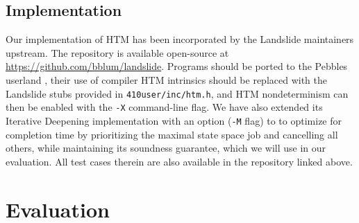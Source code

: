 \documentclass[10pt]{sigplanconf}
\begin{document}
\subsection{Implementation}

Our implementation of HTM has been incorporated by the Landslide maintainers upstream.
The repository is available open-source at \url{https://github.com/bblum/landslide}.
Programs should be ported to the Pebbles userland \cite{thrlib,kspec},
their use of compiler HTM intrinsics should be replaced with the Landslide stubs provided in {\tt 410user/inc/htm.h},
and HTM nondeterminism can then be enabled with the {\tt -X} command-line flag.
We have also extended its Iterative Deepening implementation \cite{quicksand}
with an option ({\tt -M} flag) to
to optimize for completion time by prioritizing the maximal state space job and cancelling all others,
while maintaining its soundness guarantee,
which we will use in our evaluation.
All test cases therein are also available in the repository linked above.


\section{Evaluation}

\newcommand\ETA[1]{\hilight{brownish}{{\em #1}}\xspace}
\newcommand\cpu[1]{\hilight{darkcyan}{{#1}}\xspace}
\newcommand\wtm[1]{\hilight{lime}{{#1}}\xspace}
\newcommand\ints[1]{\hilight{pinkish}{{#1}}\xspace}
\end{document}
